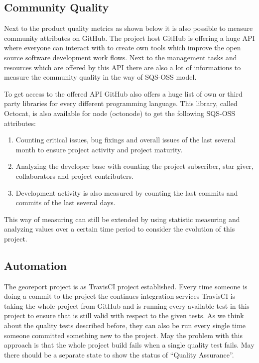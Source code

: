 \documentclass[DIV=calc,paper=a4,fontsize=9pt,twocolumn]{scrartcl}
\begin{document}
\subsection{Community Quality}

Next to the product quality metrics as shown below it is also possible to measure community attributes on GitHub. The project host GitHub is offering a huge API where everyone can interact with to create own tools which improve the open source software development work flows. Next to the management tasks and resources which are offered by this API there are also a lot of informations to measure the community quality in the way of SQS-OSS model. \citep{githubAPI2013}

To get access to the offered API GitHub also offers a huge list of own or third party libraries for every different programming language. This library, called Octocat, is also available for node (octonode) to get the following SQS-OSS attributes:

\begin{enumerate}
    \item Counting critical issues, bug fixings and overall issues of the last several month to ensure project activity and project maturity. 
    \item Analyzing the developer base with counting the project subscriber, star giver, collaborators and project contributers.
    \item Development activity is also measured by counting the last commits and commits of the last several days.
\end{enumerate}

This way of measuring can still be extended by using statistic measuring and analyzing values over a certain time period to consider the evolution of this project. 

\subsection{Automation}

The georeport project is as TravisCI project established. Every time someone is doing a commit to the project the continues integration services TravisCI is taking the whole project from GitHub and is running every available test in this project to ensure that is still valid with respect to the given tests. As we think about the quality tests described before, they can also be run every single time someone committed something new to the project. May the problem with this approach is that the whole project build fails when a single quality test fails. May there should be a separate state to show the status of \enquote{Quality Assurance}.
\end{document}
